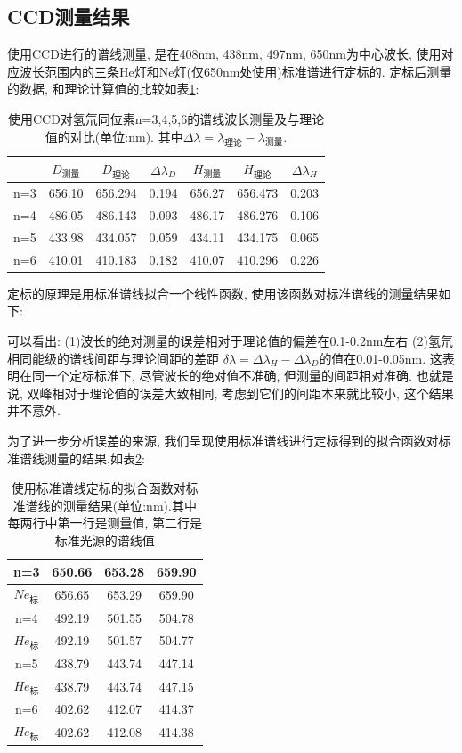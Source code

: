 \documentclass[12pt,a4paper]{article}
\begin{document}
\subsection{CCD测量结果}
使用CCD进行的谱线测量, 是在408nm, 438nm, 497nm, 650nm为中心波长, 使用对应波长范围内的三条He灯和Ne灯(仅650nm处使用)标准谱进行定标的.
定标后测量的数据, 和理论计算值的比较如表\ref{Char1}:  
\begin{table}[H]
    \centering
    \begin{tabular}{|c|c|c|c|c|c|c|}
    \hline
        & $D_{\text{测量}}$      & $D_{\text{理论}}$      & $\Delta \lambda_{D} $ & $H_{\text{测量}}$      & $H_{\text{理论}}$     & $\Delta \lambda_{H} $  \\ \hline
    n=3 & 656.10 & 656.294 & 0.194 & 656.27 & 656.473 & 0.203 \\ \hline
    n=4 & 486.05 & 486.143 & 0.093 & 486.17 & 486.276 & 0.106 \\ \hline
    n=5 & 433.98 & 434.057 & 0.059 & 434.11 & 434.175 & 0.065 \\ \hline
    n=6 & 410.01 & 410.183 & 0.182 & 410.07 & 410.296 & 0.226 \\ \hline
    \end{tabular}
    \caption{使用CCD对氢氘同位素n=3,4,5,6的谱线波长测量及与理论值的对比(单位:nm).
    其中$\Delta \lambda=\lambda_{\text{理论}}-\lambda_{\text{测量}}$.}
    \label{Char1}
    \end{table}

定标的原理是用标准谱线拟合一个线性函数, 使用该函数对标准谱线的测量结果如下:

可以看出: (1)波长的绝对测量的误差相对于理论值的偏差在0.1-0.2nm左右 (2)氢氘相同能级的谱线间距与理论间距的差距
$\delta \lambda=\Delta \lambda_{H}-\Delta \lambda_{D}$的值在0.01-0.05nm. 这表明在同一个定标标准下, 尽管波长的绝对值不准确, 但测量的间距相对准确. 
也就是说, 双峰相对于理论值的误差大致相同, 考虑到它们的间距本来就比较小, 这个结果并不意外. 

为了进一步分析误差的来源, 我们呈现使用标准谱线进行定标得到的拟合函数对标准谱线测量的结果,如表\ref{Char2}: 

\begin{table}[H]
    \centering
    \begin{tabular}{|c|c|c|c|}
    
    \hline
    n=3 & 650.66 & 653.28 & 659.90 \\ \hline
    $Ne_{\text{标}}$  & 656.65 & 653.29 & 659.90 \\ \hline
    n=4 & 492.19 & 501.55 & 504.78 \\ \hline
    $He_{\text{标}}$  & 492.19 & 501.57 & 504.77 \\ \hline
    n=5 & 438.79 & 443.74 & 447.14 \\ \hline
    $He_{\text{标}}$  & 438.79 & 443.74 & 447.15 \\ \hline
    n=6 & 402.62 & 412.07 & 414.37 \\ \hline
    $He_{\text{标}}$  & 402.62 & 412.08 & 414.38 \\ \hline
    \end{tabular}
    \caption{使用标准谱线定标的拟合函数对标准谱线的测量结果(单位:nm).其中每两行中第一行是测量值, 第二行是标准光源的谱线值}
    \label{Char2}
    \end{table}
\end{document}
